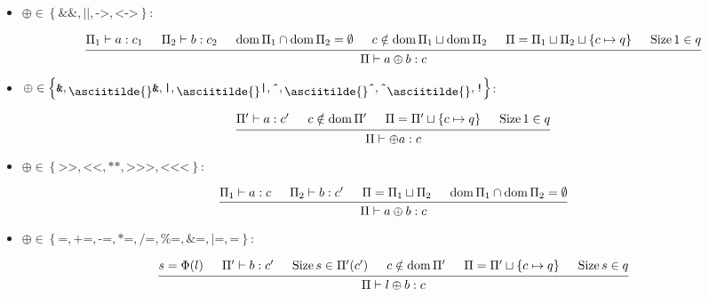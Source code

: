 \documentclass{article}
\DeclareMathOperator{\dom}{dom}
\DeclareMathOperator{\Size}{Size}
\newcommand{\mytilde}{\raisebox{-.7ex}{\asciitilde{}}}
\newcommand{\logic}{\ensuremath{\left\{\texttt{\&\&}, \texttt{||}, \texttt{->}, \texttt{<->}\right\}}}
\newcommand{\red}{\ensuremath{\left\{
      \texttt{\&}, \mytilde\texttt{\&}, \texttt{|}, \mytilde\texttt{|}, \texttt{\^{}},
      \mytilde\texttt{\^{}}, \texttt{\^{}}\mytilde, \texttt{!}
    \right\}}}
\newcommand{\shift}{\ensuremath{\left\{
      \texttt{>>}, \texttt{<}\texttt{<}, \texttt{**}, \texttt{>>>},
      \texttt{<}\texttt{<}\texttt{<}
    \right\}}}
\newcommand{\assignBinOp}{\ensuremath{\left\{
      \texttt{=}, \texttt{+=}, \texttt{-=}, \texttt{*=}, \texttt{/=},
      \texttt{\%=}, \texttt{\&=}, \texttt{|=}, \texttt{\^{}=}
    \right\}}}
\begin{document}
\begin{itemize}[leftmargin=*]
    \item $\oplus \in \logic$:

          \begin{equation*}
              \begin{prooftree}
                  \hypo{\Pi_1 \vdash a: c_1}
                  \hypo{\Pi_2 \vdash b: c_2}
                  \hypo{\dom \Pi_1 \cap \dom \Pi_2 = \emptyset}
                  \hypo{c \notin \dom \Pi_1 \sqcup \dom \Pi_2}
                  \hypo{\Pi = \Pi_1 \sqcup \Pi_2 \sqcup \left\{c \mapsto q\right\}}
                  \hypo{\Size 1 \in q}
                  \infer6{\Pi \vdash a \oplus b: c}
              \end{prooftree}
          \end{equation*}

    \item $\oplus \in \red$:

          \begin{equation*}
              \begin{prooftree}
                  \hypo{\Pi' \vdash a: c'}
                  \hypo{c \notin \dom \Pi'}
                  \hypo{\Pi = \Pi' \sqcup \left\{c \mapsto q\right\}}
                  \hypo{\Size 1 \in q}
                  \infer4{\Pi \vdash \oplus a: c}
              \end{prooftree}
          \end{equation*}

    \item $\oplus \in \shift$:

          \begin{equation*}
              \begin{prooftree}
                  \hypo{\Pi_1 \vdash a: c}
                  \hypo{\Pi_2 \vdash b: c'}
                  \hypo{\Pi = \Pi_1 \sqcup \Pi_2}
                  \hypo{\dom \Pi_1 \cap \dom \Pi_2 = \emptyset}
                  \infer4{\Pi \vdash a \oplus b: c}
              \end{prooftree}
          \end{equation*}

    \item $\oplus \in \assignBinOp$:

          \begin{equation*}
              \begin{prooftree}
                  \hypo{s = \Phi(l)}
                  \hypo{\Pi' \vdash b: c'}
                  \hypo{\Size s \in \Pi'(c')}
                  \hypo{c \notin \dom \Pi'}
                  \hypo{\Pi = \Pi' \sqcup \left\{c \mapsto q\right\}}
                  \hypo{\Size s \in q}
                  \infer6{\Pi \vdash l \oplus b: c}
              \end{prooftree}
          \end{equation*}


\end{itemize}
\end{document}
